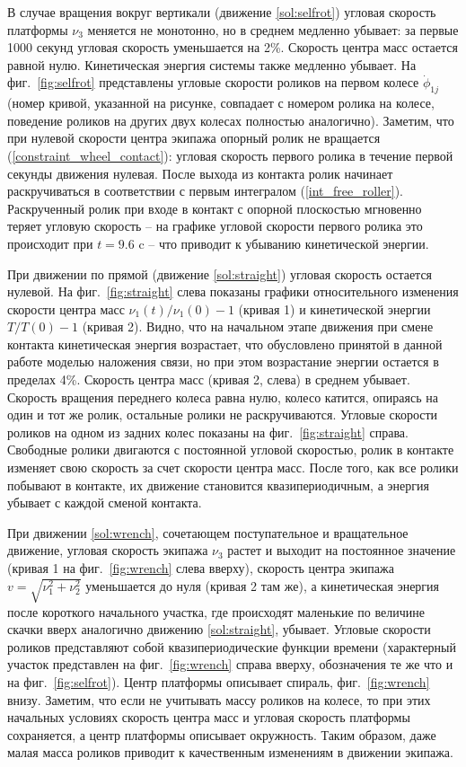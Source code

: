 В случае вращения вокруг вертикали (движение \ref{sol:selfrot}) угловая скорость платформы $\nu_3$ меняется не монотонно, но в среднем медленно убывает: за первые 1000 секунд угловая скорость уменьшается на 2\%. Скорость центра масс остается равной нулю. Кинетическая энергия системы также медленно убывает. На фиг.~\ref{fig:selfrot} представлены угловые скорости роликов на первом колесе $\dot{\phi}_{1j}$ (номер кривой, указанной на рисунке, совпадает с номером ролика на колесе, поведение роликов на других двух колесах полностью аналогично). Заметим, что при нулевой скорости центра экипажа опорный ролик не вращается (\ref{constraint_wheel_contact}): угловая скорость первого ролика в течение первой секунды движения нулевая. После выхода из контакта ролик начинает раскручиваться в соответствии с первым интегралом (\ref{int_free_roller}). Раскрученный ролик при входе в контакт с опорной плоскостью мгновенно теряет угловую скорость -- на графике угловой скорости первого ролика это происходит при $t=9.6$ c -- что приводит к убыванию кинетической энергии.

При движении по прямой (движение \ref{sol:straight}) угловая скорость остается нулевой.
На фиг.~\ref{fig:straight} слева показаны графики относительного изменения скорости центра масс $\nu_1(t)/\nu_1(0) - 1$ (кривая 1) и кинетической энергии $T/T(0)-1$ (кривая 2). Видно, что на начальном этапе движения при смене контакта кинетическая энергия возрастает, что обусловлено принятой в данной работе моделью наложения связи, но при этом возрастание энергии остается в пределах 4\%. Скорость центра масс (кривая 2, слева) в среднем убывает. Скорость вращения переднего колеса равна нулю, колесо катится, опираясь на один и тот же ролик, остальные ролики не раскручиваются. Угловые скорости роликов на одном из задних колес показаны на фиг.~\ref{fig:straight} справа. Свободные ролики двигаются с постоянной угловой скоростью, ролик в контакте изменяет свою скорость за счет скорости центра масс. После того, как все ролики побывают в контакте, их движение становится квазипериодичным, а энергия убывает с каждой сменой контакта. 

При движении \ref{sol:wrench}, сочетающем поступательное и вращательное движение, угловая скорость экипажа $\nu_3$ растет и выходит на постоянное значение (кривая 1 на фиг.~\ref{fig:wrench} слева вверху), скорость центра экипажа $v = \sqrt{\nu_1^2+\nu_2^2}$ уменьшается до нуля (кривая 2 там же), а кинетическая энергия после короткого начального участка, где происходят маленькие по величине скачки вверх аналогично движению \ref{sol:straight}, убывает. Угловые скорости роликов представляют собой квазипериодические функции времени (характерный участок представлен на фиг.~\ref{fig:wrench} справа вверху, обозначения те же что и на фиг.~\ref{fig:selfrot}). Центр платформы описывает спираль, фиг.~\ref{fig:wrench} внизу. Заметим, что если не учитывать массу роликов на колесе, то при этих начальных условиях скорость центра масс и угловая скорость платформы сохраняется, а центр платформы описывает окружность. Таким образом, даже малая масса роликов приводит к качественным изменениям в движении экипажа.

